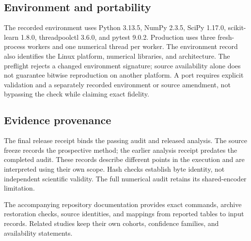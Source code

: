\subsection{Environment and portability}
The recorded environment uses Python 3.13.5, NumPy 2.3.5, SciPy 1.17.0, scikit-learn 1.8.0, threadpoolctl 3.6.0, and pytest 9.0.2. Production uses three fresh-process workers and one numerical thread per worker. The environment record also identifies the Linux platform, numerical libraries, and architecture. The preflight rejects a changed environment signature; source availability alone does not guarantee bitwise reproduction on another platform. A port requires explicit validation and a separately recorded environment or source amendment, not bypassing the check while claiming exact fidelity.

\subsection{Evidence provenance}
The final release receipt binds the passing audit and released analysis. The source freeze records the prospective method; the earlier analysis receipt predates the completed audit. These records describe different points in the execution and are interpreted using their own scope. Hash checks establish byte identity, not independent scientific validity. The full numerical audit retains its shared-encoder limitation.

The accompanying repository documentation provides exact commands, archive restoration checks, source identities, and mappings from reported tables to input records. Related studies keep their own cohorts, confidence families, and availability statements.
